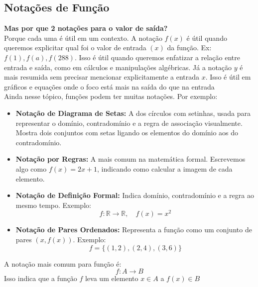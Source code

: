\documentclass{article}
\begin{document}
\subsection{Notações de Função}

\textbf{Mas por que 2 notações para o valor de saída?}
\\[5pt]
Porque cada uma é útil em um contexto. A notação $f(x)$ é útil quando queremos explicitar qual foi o valor de entrada $(x)$ da função. Ex: $f(1), f(a), f(288)$. Isso é útil quando queremos enfatizar a relação entre entrada e saída, como em cálculos e manipulações algébricas. Já a notação $y$ é mais resumida sem precisar mencionar explicitamente a entrada $x$. Isso é útil em gráficos e equações onde o foco está mais na saída do que na entrada
\\[5pt]
Ainda nesse tópico, funções podem ter muitas notações. Por exemplo:
\begin{itemize}
    
    \item \textbf{Notação de Diagrama de Setas:} A dos círculos com setinhas, usada para representar o domínio, contradomínio e a regra de associação visualmente. Mostra dois conjuntos com setas ligando os elementos do domínio aos do contradomínio.
    
    \item \textbf{Notação por Regras:} A mais comum na matemática formal. Escrevemos algo como \( f(x) = 2x + 1 \), indicando como calcular a imagem de cada elemento.
    
    \item \textbf{Notação de Definição Formal:} Indica domínio, contradomínio e a regra ao mesmo tempo. Exemplo: 
    \[
    f: \mathbb{R} \to \mathbb{R}, \quad f(x) = x^2
    \]
    
    \item \textbf{Notação de Pares Ordenados:} Representa a função como um conjunto de pares \( (x, f(x)) \). Exemplo: 
    \[
    f = \{ (1, 2), (2, 4), (3, 6) \}
    \]
\end{itemize}

A notação mais comum para função é:
\[
f: A \to B
\]
Isso indica que a função $f$ leva um elemento $x \in A$ a $f(x) \in B$
\end{document}

